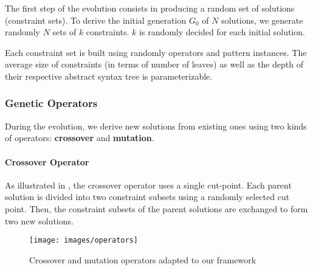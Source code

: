 The first step of the evolution consists in producing a random set of solutions (\ie constraint sets). To derive the initial generation $G_0$ of $N$ solutions, we generate randomly $N$ sets of $k$ constraints. $k$ is randomly decided for each initial solution.

Each constraint set is built using randomly operators and pattern instances. The average size of constraints (in terms of number of leaves) as well as the depth of their respective abstract syntax tree is parameterizable.


\subsubsection{Genetic Operators}

During the evolution, we derive new solutions from existing ones using two kinds of operators: \textbf{crossover} and \textbf{mutation}.

\paragraph{Crossover Operator}

As illustrated in , the crossover operator uses a single cut-point. Each parent solution is divided into two constraint subsets using a randomly selected cut point. Then, the constraint subsets of the parent solutions are exchanged to form two new solutions.

\begin{figure}[h]
	\centering
	\texttt{[image: images/operators]}
	\caption{Crossover and mutation operators adapted to our framework}
	\label{fig:ap-operators}
\end{figure}

